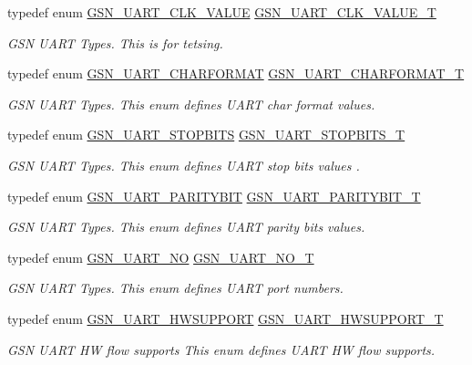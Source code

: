 \begin{DoxyCompactItemize}
typedef enum \hyperlink{a00656_ga7b923f8de1d1d52f2879a94bce534a31}{GSN\_\-UART\_\-CLK\_\-VALUE} \hyperlink{a00656_ga20d80c69e5cf0a5f5460e7fe0cfb2787}{GSN\_\-UART\_\-CLK\_\-VALUE\_\-T}
\begin{DoxyCompactList}\small\item\em GSN UART Types. This is for tetsing. \end{DoxyCompactList}\item 
typedef enum \hyperlink{a00656_ga67767f968b0ccabbdd2c41c40f826e4e}{GSN\_\-UART\_\-CHARFORMAT} \hyperlink{a00656_gaf208b91b10fde1d137e4ec8a7dde641b}{GSN\_\-UART\_\-CHARFORMAT\_\-T}
\begin{DoxyCompactList}\small\item\em GSN UART Types. This enum defines UART char format values. \end{DoxyCompactList}\item 
typedef enum \hyperlink{a00656_ga4871fc0b0bc6480a9cbee4d0694d23e8}{GSN\_\-UART\_\-STOPBITS} \hyperlink{a00656_gad24814e9f0d44d09137d1984c23155c1}{GSN\_\-UART\_\-STOPBITS\_\-T}
\begin{DoxyCompactList}\small\item\em GSN UART Types. This enum defines UART stop bits values . \end{DoxyCompactList}\item 
typedef enum \hyperlink{a00656_gac5a3ad4d3d1621c5ed941f57ad0b6679}{GSN\_\-UART\_\-PARITYBIT} \hyperlink{a00656_ga62f12eb4660a18fb77ba09b0625d0c8e}{GSN\_\-UART\_\-PARITYBIT\_\-T}
\begin{DoxyCompactList}\small\item\em GSN UART Types. This enum defines UART parity bits values. \end{DoxyCompactList}\item 
typedef enum \hyperlink{a00656_gad707454e495f43928eae3af5419aebba}{GSN\_\-UART\_\-NO} \hyperlink{a00656_ga2e91880e4d139a83add2ffc3a75ad653}{GSN\_\-UART\_\-NO\_\-T}
\begin{DoxyCompactList}\small\item\em GSN UART Types. This enum defines UART port numbers. \end{DoxyCompactList}\item 
typedef enum \hyperlink{a00656_ga533c64d91240c65815984fe1f73817b2}{GSN\_\-UART\_\-HWSUPPORT} \hyperlink{a00656_gaf4df97392dfefed655a81fe500a74162}{GSN\_\-UART\_\-HWSUPPORT\_\-T}
\begin{DoxyCompactList}\small\item\em GSN UART HW flow supports This enum defines UART HW flow supports. \end{DoxyCompactList}\item 

\end{DoxyCompactItemize}
